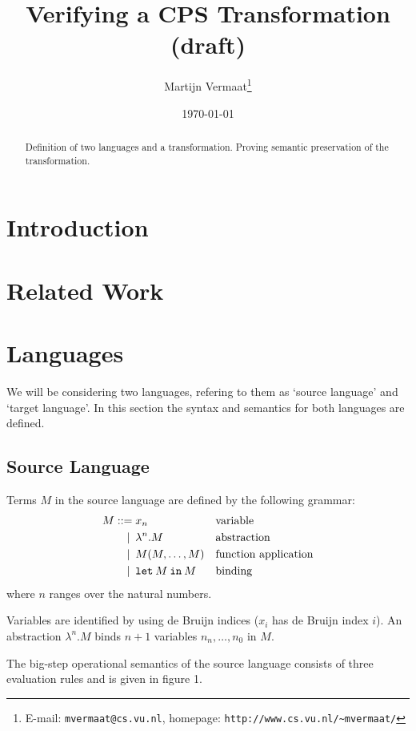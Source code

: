 \documentclass[a4paper,11pt]{article}
\title{Verifying a CPS Transformation (draft)}
\author{Martijn Vermaat\footnote{E-mail: \texttt{mvermaat@cs.vu.nl},
    homepage: \texttt{http://www.cs.vu.nl/\~{}mvermaat/}}}
\date{\today}
\begin{document}
\maketitle


\begin{abstract}
  Definition of two languages and a transformation. Proving semantic preservation of the transformation.
\end{abstract}


\section{Introduction}\label{sec:introduction}


\section{Related Work}\label{sec:related}


\section{Languages}\label{sec:languages}

We will be considering two languages, refering to them as `source language' and `target language'. In this section
the syntax and semantics for both languages are defined.

\subsection{Source Language}

Terms $M$ in the source language are defined by the following grammar:
\begin{align*}
M ::=             &\; x_{n}
                  && \text{variable} \\
\llap{\textbar\:} &\; \lambda^{n}.M
                  && \text{abstraction} \\
\llap{\textbar\:} &\; M(M, \ldots, M)
                  && \text{function application} \\
\llap{\textbar\:} &\; \texttt{let} \: M \: \texttt{in} \: M
                  && \text{binding}
\end{align*}
where $n$ ranges over the natural numbers.

Variables are identified by using de Bruijn indices ($x_{i}$ has de Bruijn index $i$). An abstraction
$\lambda^{n}.M$ binds $n+1$ variables $n_{n}, \ldots, n_{0}$ in $M$.


The big-step operational semantics of the source language consists of three evaluation rules and is given in
figure 1.
\end{document}
